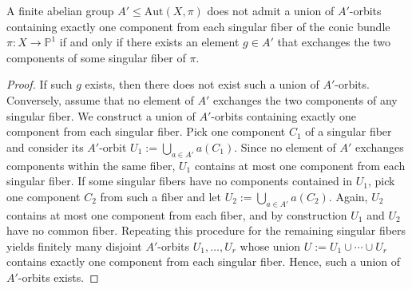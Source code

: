\documentclass[10pt,a4paper]{amsart}
\newcommand{\Aut}{\mathrm{Aut}}
\newcommand{\PP}{\mathbb{P}}
\begin{document}
\begin{lemma}
A finite abelian group $A' \leqslant \Aut(X,\pi)$ does not admit a union of $A'$-orbits containing exactly one component from each singular fiber of the conic bundle $\pi:X\to \PP^1$ if and only if there exists an element $g\in A'$ that exchanges the two components of some singular fiber of $\pi$.
\end{lemma}

\begin{proof}
 If such $g$ exists, then there does not exist such a union of $A'$-orbits. Conversely, assume that no element of $A'$ exchanges the two components of any singular fiber.
We construct a union of $A'$-orbits containing exactly one component from each singular fiber. Pick one component $C_1$ of a singular fiber and consider its $A'$-orbit
$
U_1 := \bigcup_{a\in A'} a(C_1).
$
Since no element of $A'$ exchanges components within the same fiber, $U_1$ contains at most one component from each singular fiber.
If some singular fibers have no components contained in $U_1$, pick one component $C_2$ from such a fiber and let
$
U_2 := \bigcup_{a\in A'} a(C_2).
$
Again, $U_2$ contains at most one component from each fiber, and by construction $U_1$ and $U_2$ have no common fiber.
Repeating this procedure for the remaining singular fibers yields finitely many disjoint $A'$-orbits
$
U_1,\ldots,U_r$
whose union
$U := U_1 \cup \cdots \cup U_r$
contains exactly one component from each singular fiber.
Hence, such a union of $A'$-orbits exists.
\end{proof}
\end{document}
